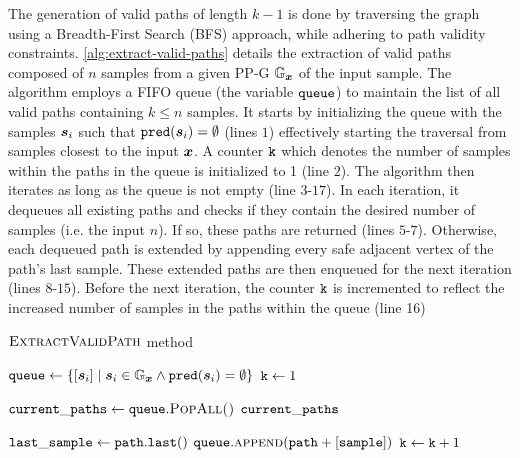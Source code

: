 The generation of valid paths of length $k-1$ is done by traversing the graph using a Breadth-First Search (BFS) approach, while adhering to path validity constraints. \autoref{alg:extract-valid-paths} details the extraction of valid paths composed of $n$ samples from a given \acs{PP-G} $\mathbb{G}_{\bm{x}}$ of the input sample. The algorithm employs a FIFO queue (the variable $\mathtt{queue}$) to maintain the list of all valid paths containing $k \leq n$ samples. It starts by initializing the queue with the samples $\bm{s}_{i}$ such that $\boldsymbol{\mathtt{pred}}(\bm{s}_{i}) = \emptyset$ (lines $1$) effectively starting the traversal from samples closest to the input $\bm{x}$. A counter $\mathtt{k}$ which denotes the number of samples within the paths in the queue is initialized to 1 (line $2$). The algorithm then iterates as long as the queue is not empty (line $3$-$17$). In each iteration, it dequeues all existing paths and checks if they contain the desired number of samples (i.e. the input $n$). If so, these paths are returned (lines $5$-$7$). Otherwise, each dequeued path is extended by appending every safe adjacent vertex of the path's last sample. These extended paths are then enqueued for the next iteration (lines $8$-$15$). Before the next iteration, the counter $\mathtt{k}$ is incremented to reflect the increased number of samples in the paths within the queue (line 16)
\begin{algorithm}[H]
	\caption[$\algtitle{ExtractValidPath}$ method]{$\algtitle{ExtractValidPath}$ method}
	\label{alg:extract-valid-paths}
	\begin{algorithmic}[1]

    \State $\mathtt{queue} \gets \{[\bm{s}_{i}] \mid \bm{s}_{i} \in \mathbb{G}_{\bm{x}}
    \wedge \boldsymbol{\mathtt{pred}}(\bm{s}_{i}) = \emptyset\}$
    \State $\mathtt{k} \gets 1$

      \State $\mathtt{current\_paths} \gets \mathtt{queue}.\textsc{PopAll()}$
          \State \Return $\mathtt{current\_paths}$
      \EndIf

        \State $\mathtt{last\_sample} \gets \mathtt{path.last()}$
            \State $\mathtt{queue}.\textsc{append}(\mathtt{path} + [\mathtt{sample}])$
          \EndIf
        \EndFor
      \EndFor
      \State $\mathtt{k} \gets \mathtt{k} + 1$
      \EndWhile
	\end{algorithmic}
\end{algorithm}

